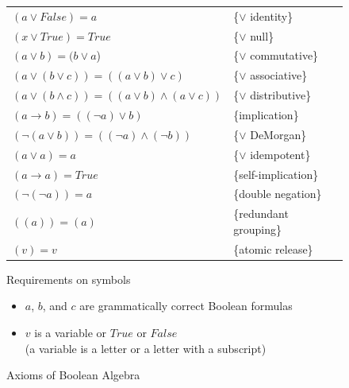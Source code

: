 \begin{figure}
\begin{center}
\begin{tabular}{ll}
$(a \vee False) = a$                                     & \{$\vee$ identity\} \\
$(x \vee True) = True$                                   & \{$\vee$ null\} \\
$(a \vee b) = (b \vee a$)                                & \{$\vee$ commutative\} \\
$(a \vee (b \vee c)) = ((a \vee b) \vee c)$              & \{$\vee$ associative\} \\
$(a \vee (b \wedge c)) = ((a \vee b) \wedge (a \vee c))$ & \{$\vee$ distributive\} \\
$(a \rightarrow b) = ((\neg a) \vee b)$                  & \{implication\} \\
$(\neg(a \vee b)) = ((\neg a) \wedge (\neg b))$          & \{$\vee$ DeMorgan\} \\
$(a \vee a) = a$                                         & \{$\vee$ idempotent\} \\
$(a \rightarrow a) = True$                               & \{self-implication\} \\
$(\neg(\neg a))  = a$                                    & \{double negation\} \\
$((a)) = (a)$                                            & \{redundant grouping\} \\
$(v) = v$                                                & \{atomic release\} \\
\end{tabular}
\end{center}
Requirements on symbols
\begin{itemize}
\item $a$, $b$, and $c$ are grammatically correct Boolean formulas
\item $v$ is a variable or $True$ or $False$
\\(a variable is a letter or a letter with a subscript)
\end{itemize}
\caption{Axioms of Boolean Algebra}
\label{fig-02-boolean-axioms}
\end{figure}

